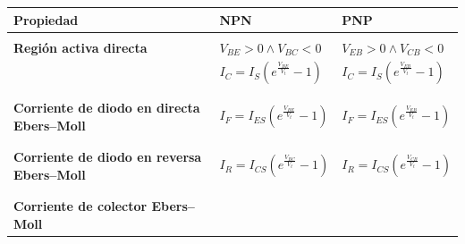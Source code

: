 \documentclass[11pt]{article}
\begin{document}
\begin{table}
	\centering
	\begin{tabular}{|p{4.2cm}|l|l|}
		\hline
		Propiedad & NPN                                                                                                   & PNP \\
		\hline
		          &                                                                                                       &     \\
		\textbf{Región activa directa}
		          & $V_{BE} > 0 \land V_{BC} < 0$
		          & $V_{EB} > 0 \land V_{CB} < 0$                                                                               \\
		          & $I_C = I_S\left(e^{\frac{V_{BE}}{V_t}} - 1\right)$\color{red}{$\left(1 + \dfrac{V_{CE}}{V_A}\right)$}
		          & $I_C = I_S\left(e^{\frac{V_{EB}}{V_t}} - 1\right)$\color{red}{$\left(1 + \dfrac{V_{EC}}{V_A}\right)$}       \\
		          &                                                                                                       &     \\
		\hline
		          &                                                                                                       &     \\
		\textbf{Corriente de diodo en directa Ebers--Moll}
		          & $I_F = I_{ES}\left(e^{\frac{V_{BE}}{V_t}} - 1\right)$
		          & $I_F = I_{ES}\left(e^{\frac{V_{EB}}{V_t}} - 1\right)$                                                       \\
		          &                                                                                                       &     \\
		\hline
		          &                                                                                                       &     \\
		\textbf{Corriente de diodo en reversa Ebers--Moll}
		          & $I_R = I_{CS}\left(e^{\frac{V_{BC}}{V_t}} - 1\right)$
		          & $I_R = I_{CS}\left(e^{\frac{V_{CB}}{V_t}} - 1\right)$                                                       \\
		          &                                                                                                       &     \\
		\hline
		          &                                                                                                       &     \\
		\textbf{Corriente de colector Ebers--Moll}

\end{tabular}
\end{table}
\end{document}
